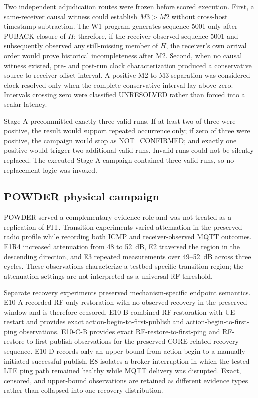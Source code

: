 \documentclass[journal]{IEEEtran}
\begin{document}
Two independent adjudication routes were frozen before scored execution. First, a same-receiver causal witness could establish $M3>M2$ without cross-host timestamp subtraction. The W1 program generates sequence 5001 only after PUBACK closure of $H$; therefore, if the receiver observed sequence 5001 and subsequently observed any still-missing member of $H$, the receiver's own arrival order would prove historical incompleteness after M2. Second, when no causal witness existed, pre- and post-run clock characterization produced a conservative source-to-receiver offset interval. A positive M2-to-M3 separation was considered clock-resolved only when the complete conservative interval lay above zero. Intervals crossing zero were classified UNRESOLVED rather than forced into a scalar latency.

Stage A precommitted exactly three valid runs. If at least two of three were positive, the result would support repeated occurrence only; if zero of three were positive, the campaign would stop as NOT\_CONFIRMED; and exactly one positive would trigger two additional valid runs. Invalid runs could not be silently replaced. The executed Stage-A campaign contained three valid runs, so no replacement logic was invoked.

\subsection{POWDER physical campaign}

POWDER served a complementary evidence role and was not treated as a replication of FIT. Transition experiments varied attenuation in the preserved radio profile while recording both ICMP and receiver-observed MQTT outcomes. E1R4 increased attenuation from 48 to 52~dB, E2 traversed the region in the descending direction, and E3 repeated measurements over 49--52~dB across three cycles. These observations characterize a testbed-specific transition region; the attenuation settings are not interpreted as a universal RF threshold.

Separate recovery experiments preserved mechanism-specific endpoint semantics. E10-A recorded RF-only restoration with no observed recovery in the preserved window and is therefore censored. E10-B combined RF restoration with UE restart and provides exact action-begin-to-first-publish and action-begin-to-first-ping observations. E10-C-B provides exact RF-restore-to-first-ping and RF-restore-to-first-publish observations for the preserved CORE-related recovery sequence. E10-D records only an upper bound from action begin to a manually initiated successful publish. E8 isolates a broker interruption in which the tested LTE ping path remained healthy while MQTT delivery was disrupted. Exact, censored, and upper-bound observations are retained as different evidence types rather than collapsed into one recovery distribution.
\end{document}
